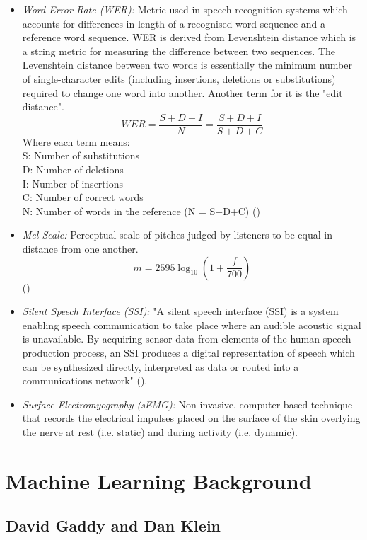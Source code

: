 \begin{itemize}
  \item \emph{Word Error Rate (WER):}
  Metric used in speech recognition systems which accounts for differences in length of
  a recognised word sequence and a reference word sequence. WER is derived from
  Levenshtein distance  which is a string metric for measuring the difference between two
  sequences. The Levenshtein distance between two words is essentially the minimum number of
  single-character edits (including insertions, deletions or substitutions) required to
  change one word into another. Another term for it is the "edit distance".
  \[
    WER
    = \dfrac{S + D + I}{N}
    = \dfrac{S + D + I}{S + D + C}
  \]
  Where each term means:\\
  S: Number of substitutions\\
  D: Number of deletions\\
  I: Number of insertions\\
  C: Number of correct words\\
  N: Number of words in the reference (N = S+D+C)
  (\cite{1966SPhD...10..707L})
  \item \emph{Mel-Scale:}
  Perceptual scale of pitches judged by listeners to be equal in distance from one another.
  \[ m = 2595 \log_{10} \left(1 + \dfrac{f}{700}\right) \]
  (\cite{mel_scale_formula})
  \item \emph{Silent Speech Interface (SSI):}
  "A silent speech interface (SSI) is a system enabling speech communication to take
  place where an audible acoustic signal is unavailable. By acquiring sensor data from
  elements of the human speech production process, an SSI produces a digital representation
  of speech which can be synthesized directly, interpreted as data or routed into a communications
  network" (\cite{ssi_definition}).
  \item \emph{Surface Electromyography (sEMG):}
  Non-invasive, computer-based technique that records the electrical impulses placed on the surface
  of the skin overlying the nerve at rest (i.e. static) and during activity (i.e. dynamic).
\end{itemize}

\section{Machine Learning Background}

\subsection{David Gaddy and Dan Klein}

